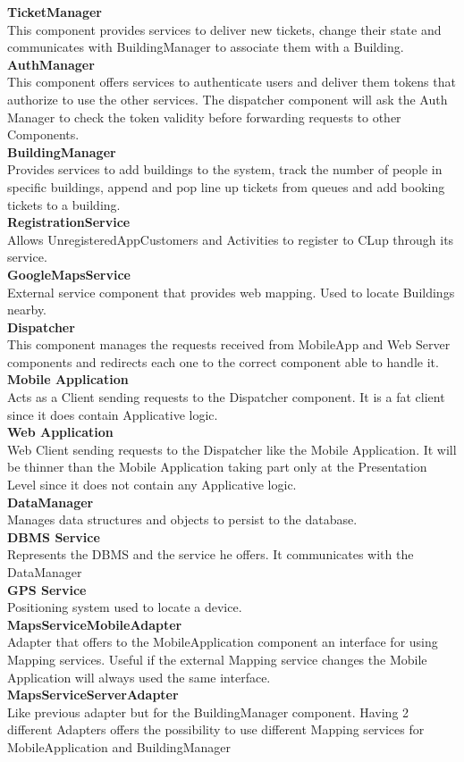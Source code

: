 \textbf{TicketManager}\\
This component provides services to deliver new tickets, change their state and communicates with BuildingManager to associate them with a Building.\\
\textbf{AuthManager}\\
This component offers services to authenticate users and deliver them tokens that authorize to use the other services. The dispatcher component will ask the Auth Manager to check the token validity before forwarding requests to other Components.\\
\textbf{BuildingManager}\\
Provides services to add buildings to the system, track the number of people in specific buildings, append and pop line up tickets from queues and add booking tickets to a building.\\
\textbf{RegistrationService}\\
Allows UnregisteredAppCustomers and Activities to register to CLup through its service.\\
\textbf{GoogleMapsService}\\
External service component that provides web mapping. Used to locate Buildings nearby.\\
\textbf{Dispatcher}\\
This component manages the requests received from MobileApp and Web Server components and redirects each one to the correct component able to handle it.\\
\textbf{Mobile Application}\\
Acts as a Client sending requests to the Dispatcher component.
It is a fat client since it does contain Applicative logic.\\
\textbf{Web Application}\\
Web Client sending requests to the Dispatcher like the Mobile Application. It will be thinner than the Mobile Application taking part only at the Presentation Level since it does not contain any Applicative logic.\\
\textbf{DataManager}\\
Manages data structures and objects to persist to the database.\\
\textbf{DBMS Service}\\
Represents the DBMS and the service he offers. It communicates with the DataManager\\
\textbf{GPS Service}\\
Positioning system used to locate a device.\\
\textbf{MapsServiceMobileAdapter}\\
Adapter that offers to the MobileApplication component an interface for using Mapping services. Useful if the external Mapping service changes the Mobile Application will always used the same interface.\\
\textbf{MapsServiceServerAdapter}\\
Like previous adapter but for the BuildingManager component. Having 2 different Adapters offers the possibility to use different Mapping services for MobileApplication and BuildingManager 


